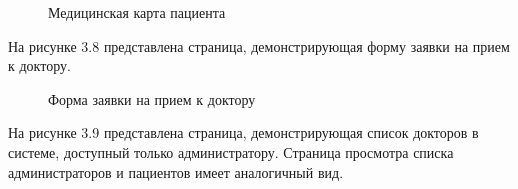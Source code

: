 \begin{figure}[!h]
	\caption{Медицинская карта пациента}
\end{figure}

На рисунке 3.8 представлена страница, демонстрирующая форму заявки на прием к доктору.

\begin{figure}[!h]
	\caption{Форма заявки на прием к доктору}
\end{figure}

\clearpage

На рисунке 3.9 представлена страница, демонстрирующая список докторов в системе, доступный только администратору. Страница просмотра списка администраторов и пациентов имеет аналогичный вид.

